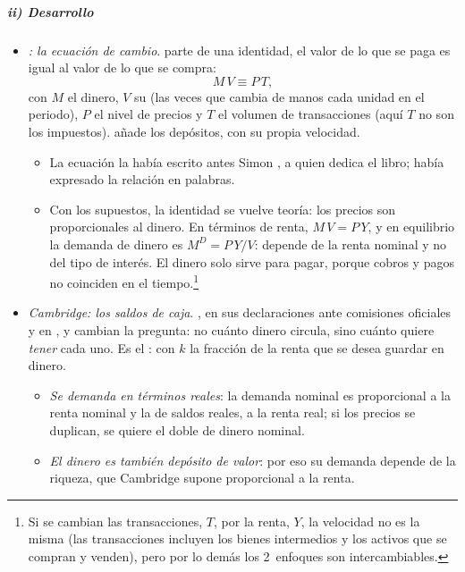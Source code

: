 \documentclass[11pt]{article}
\begin{document}
\subparagraph{ii) Desarrollo}

\begin{itemize}
\item \emph{: la ecuación de cambio}. \textcite{Fisher1911Purchasing} parte de una identidad, el valor de lo que se paga es igual al valor de lo que se compra:
  \begin{equation}
  M\,V\equiv P\,T, \label{eq:cuantitativa}
  \end{equation}
  con $M$ el dinero, $V$ su  (las veces que cambia de manos cada unidad en el periodo), $P$ el nivel de precios y $T$ el volumen de transacciones (aquí $T$ no son los impuestos).  añade los depósitos, con su propia velocidad.
  \begin{itemize}
  \item La ecuación la había escrito antes Simon \textcite{Newcomb1885Principles}, a quien  dedica el libro;  había expresado la relación en palabras.
  \item Con los supuestos, la identidad se vuelve teoría: los precios son proporcionales al dinero. En términos de renta, $M\,V=P\,Y$, y en equilibrio la demanda de dinero es $M^D=P\,Y/V$: depende de la renta nominal y no del tipo de interés. El dinero solo sirve para pagar, porque cobros y pagos no coinciden en el tiempo.\footnote{Si se cambian las transacciones, $T$, por la renta, $Y$, la velocidad no es la misma (las transacciones incluyen los bienes intermedios y los activos que se compran y venden), pero por lo demás los 2~enfoques son intercambiables\nocite{Serletis2007Demand}.}
  \end{itemize}
\item \emph{Cambridge: los saldos de caja}. , en sus declaraciones ante comisiones oficiales y en \textcite{Marshall1923}, y \textcite{Pigou1917Value} cambian la pregunta: no cuánto dinero circula, sino cuánto quiere \emph{tener} cada uno. Es el :
  con $k$ la fracción de la renta que se desea guardar en dinero.
  \begin{itemize}
  \item \emph{Se demanda en términos reales}: la demanda nominal es proporcional a la renta nominal y la de saldos reales, a la renta real; si los precios se duplican, se quiere el doble de dinero nominal.
  \item \emph{El dinero es también depósito de valor}: por eso su demanda depende de la riqueza, que Cambridge supone proporcional a la renta.

\end{itemize}
\end{itemize}
\end{document}
